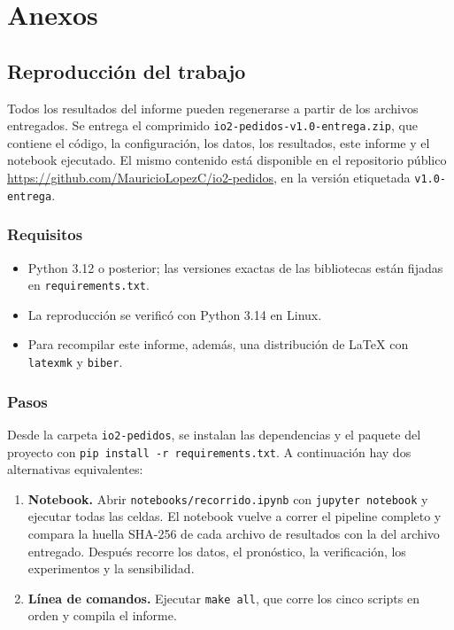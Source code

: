 \section{Anexos}

\subsection{Reproducción del trabajo}
\label{anexo:reproduccion}

Todos los resultados del informe pueden regenerarse a partir de los archivos entregados.
Se entrega el comprimido \texttt{io2-pedidos-v1.0-entrega.zip}, que contiene el código, la configuración, los datos, los resultados, este informe y el notebook ejecutado.
El mismo contenido está disponible en el repositorio público \url{https://github.com/MauricioLopezC/io2-pedidos}, en la versión etiquetada \texttt{v1.0-entrega}.

\subsubsection*{Requisitos}

\begin{itemize}
  \item Python 3.12 o posterior; las versiones exactas de las bibliotecas están fijadas en \texttt{requirements.txt}.
  \item La reproducción se verificó con Python 3.14 en Linux.
  \item Para recompilar este informe, además, una distribución de \LaTeX{} con \texttt{latexmk} y \texttt{biber}.
\end{itemize}

\subsubsection*{Pasos}

Desde la carpeta \texttt{io2-pedidos}, se instalan las dependencias y el paquete del proyecto con \texttt{pip install -r requirements.txt}.
A continuación hay dos alternativas equivalentes:

\begin{enumerate}
  \item \textbf{Notebook.} Abrir \texttt{notebooks/recorrido.ipynb} con \texttt{jupyter notebook} y ejecutar todas las celdas.
  El notebook vuelve a correr el pipeline completo y compara la huella SHA-256 de cada archivo de resultados con la del archivo entregado.
  Después recorre los datos, el pronóstico, la verificación, los experimentos y la sensibilidad.
  \item \textbf{Línea de comandos.} Ejecutar \texttt{make all}, que corre los cinco scripts en orden y compila el informe.
\end{enumerate}

